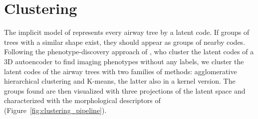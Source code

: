 
\section{Clustering}                     %
\label{sec:clustering}                   %

The implicit model of represents every airway tree by a latent code. If
groups of trees with a similar shape exist, they should appear as groups of nearby codes. Following
the phenotype-discovery approach of \citet{norouzi2024volpam}, who cluster the latent codes of a
3D autoencoder to find imaging phenotypes without any labels, we cluster the latent codes of the
airway trees with two families of methods: agglomerative hierarchical clustering and K-means,
the latter also in a kernel version. The groups found are then visualized with three
projections of the latent space and characterized with the morphological descriptors of
 (Figure~\ref{fig:clustering_pipeline}).

